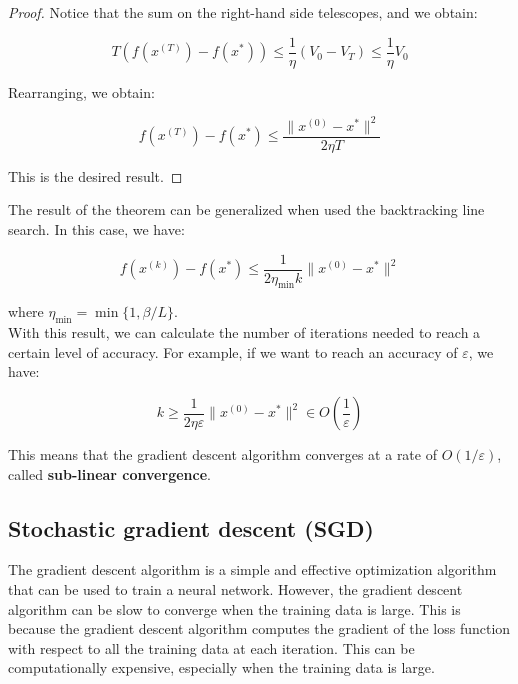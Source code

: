 \begin{proof}
    Notice that the sum on the right-hand side telescopes, and we obtain:

    $$T(f(x^{(T)}) - f(x^*)) \leq \frac{1}{\eta} (V_0 - V_T) \leq \frac{1}{\eta} V_0$$

    Rearranging, we obtain:

    $$f(x^{(T)}) - f(x^*) \leq \frac{\| x^{(0)} - x^* \|^2}{2 \eta T}$$

    This is the desired result.

\end{proof}

\vspace{5em}

The result of the theorem can be generalized when used the backtracking line search. In this case,
we have:

\begin{equation}
    f(x^{(k)}) - f(x^*) \leq \frac{1}{2 \eta_{\min} k} \| x^{(0)} - x^* \|^2
\end{equation}

where $\eta_{\min} = \min \{1, \beta / L\}$.\\

With this result, we can calculate the number of iterations needed to reach a certain level of
accuracy. For example, if we want to reach an accuracy of $\varepsilon$, we have:

\begin{equation}
    k \geq \frac{1}{2 \eta \varepsilon} \| x^{(0)} - x^* \|^2 \in O\left(\frac{1}{\varepsilon}\right)
\end{equation}

This means that the gradient descent algorithm converges at a rate of $O(1/\varepsilon)$, called
\textbf{sub-linear convergence}. 


\subsection{Stochastic gradient descent (SGD)}

The gradient descent algorithm is a simple and effective optimization algorithm that can be used
to train a neural network. However, the gradient descent algorithm can be slow to converge when
the training data is large. This is because the gradient descent algorithm computes the gradient
of the loss function with respect to all the training data at each iteration. This can be
computationally expensive, especially when the training data is large.\\

